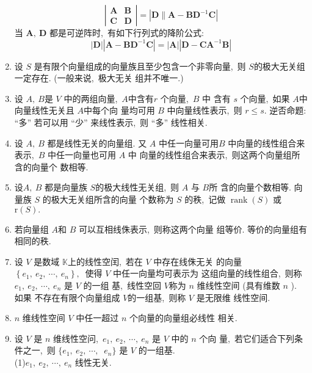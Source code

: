 \begin{enumerate}
		$$	\left|\begin{array}{ll}
			\boldsymbol{A} & \boldsymbol{B} \\
			\boldsymbol{C} & \boldsymbol{D}
		\end{array}\right|=\left|\boldsymbol{D} \| \boldsymbol{A}-\boldsymbol{B} \boldsymbol{D}^{-1} \boldsymbol{C}\right|$$
		当  $\boldsymbol{A},\  \boldsymbol{D} $ 都是可逆阵时,\ 有如下行列式的降阶公式:
		$$|\boldsymbol{D}|\left|\boldsymbol{A}-\boldsymbol{B} \boldsymbol{D}^{-1} \boldsymbol{C}\right|=|\boldsymbol{A}|\left|\boldsymbol{D}-\boldsymbol{C} \boldsymbol{A}^{-1} \boldsymbol{B}\right|$$
		\item 设  $S$ 是有限个向量组成的向量族且至少包含一个非零向量,\  则 $S$的极大无关组一定存在. (一般来说,\  极大无关 组并不唯一.)
		\item 设 $ A,\  B  $是  $V$ 中的两组向量,\  $ A  $中含有$ r $ 个向量,\   $B$  中 含有  $s$  个向量,\  如果  $A$中向量线性无关且 $ A  $中每个向 量均可用  $B$ 中向量线性表示,\  则  $r \leqslant s .$
		逆否命题: “多” 若可以用 “少” 来线性表示,\  则 “多” 线性相关.
		\item 设 $ A,\  B $ 都是线性无关的向量组. 又  $A $ 中任一向量可用$  B$  中向量的线性组合来表示,\  $ B$  中任一向量也可用 $ A $ 中 向量的线性组合来表示,\  则这两个向量组所含的向量个 数相等.
		\item 设$  A,\  B$  都是向量族  $S  $的极大线性无关组,\  则 $ A $ 与 $ B  $所 含的向量个数相等. 向量族  $S$  的极大无关组所含的向量 个数称为  $S$  的秩,\  记做  $\operatorname{rank}(S) $ 或  $\mathrm{r}(S) .$
		\item 若向量组 $ A  $和 $ B $ 可以互相线侏表示,\  则称这两个向量 组等价. 等价的向量组有相同的秩.
		\item 设 $ V $ 是数域 $ \mathbb{K}  $上的线性空闰,\  若在 $ V $ 中存在线侏无关 的向量 $ \left\{e_{1},\  e_{2},\  \cdots,\  e_{n}\right\} ,\ $ 使得 $ V$  中任一向量均可表示为 这组向量的线性组合,\  则称$  e_{1},\  e_{2},\  \cdots,\  e_{n} $ 是 $ V $ 的一组 基,\  线性空回 $ V  $称为  $n $ 维线性空间 (具有维数  $n$  ). 如果 不存在有限个向量组成 $ V  $的一组基,\  则称  $V $ 是无限维 线性空间.
		\item $n$  维线性空间 $ V$  中任一超过 $ n $ 个向量的向量组必线性 相关.
		\item 设 $ V $ 是 $ n$  维线性空问,\   $e_{1},\  e_{2},\  \cdots,\  e_{n} $ 是  $V $ 中的  $n $ 个向 量,\  若它们适合下列条件之一,\  则 $ \{e_{1},\  e_{2},\  \cdots,\ $ $e_{n}\} $ 是  $V$  的一组基.\\
		(1)$  e_{1},\  e_{2},\  \cdots,\  e_{n}$  线性无关.\\

\end{enumerate}
